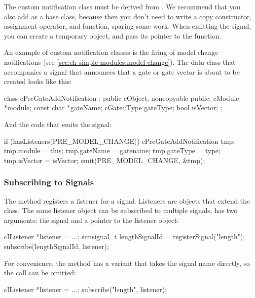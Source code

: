 The custom notification class must be derived from .
We recommend that you also add  as a base class, because
then you don't need to write a copy constructor, assignment operator, and
 function, sparing some work. When emitting the signal, you
can create a temporary object, and pass its pointer to the 
function.

An example of custom notification classes is the firing of model change notifications
(see \ref{sec:ch-simple-modules:model-change}). The data class
that accompanies a signal that announces that a gate or gate vector is
about to be created looks like this:

\begin{cpp}
class cPreGateAddNotification : public cObject, noncopyable
{
  public:
    cModule *module;
    const char *gateName;
    cGate::Type gateType;
    bool isVector;
};
\end{cpp}

And the code that emits the signal:

\begin{cpp}
if (hasListeners(PRE_MODEL_CHANGE))
{
    cPreGateAddNotification tmp;
    tmp.module = this;
    tmp.gateName = gatename;
    tmp.gateType = type;
    tmp.isVector = isVector;
    emit(PRE_MODEL_CHANGE, &tmp);
}
\end{cpp}


\subsubsection{Subscribing to Signals}

The  method registers a listener for a signal.
Listeners are objects that extend the  class.
The same listener object can be subscribed to multiple signals.
 has two arguments: the signal and a pointer to
the listener object:

\begin{cpp}
cIListener *listener = ...;
simsignal_t lengthSignalId = registerSignal("length");
subscribe(lengthSignalId, listener);
\end{cpp}

For convenience, the  method has a variant
that takes the signal name directly, so the 
call can be omitted:

\begin{cpp}
cIListener *listener = ...;
subscribe("length", listener);
\end{cpp}

